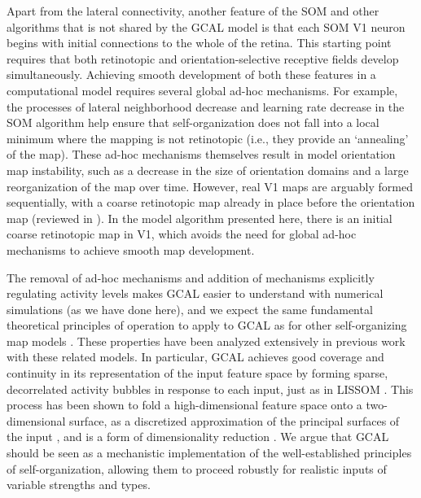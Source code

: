 \documentclass{article}
\begin{document}
Apart from the lateral connectivity, another feature of the SOM and
other algorithms that is not shared by the GCAL model is that each SOM
V1 neuron begins with initial connections to the whole of the
retina. This starting point requires that both retinotopic and
orientation-selective receptive fields develop simultaneously.
Achieving smooth development of both these features in a computational
model requires several global ad-hoc mechanisms. For example, the
processes of lateral neighborhood decrease and learning rate decrease in
the SOM algorithm help ensure that self-organization does not fall
into a local minimum where the mapping is not retinotopic (i.e., they
provide an `annealing' of the map).  These ad-hoc mechanisms
themselves result in model orientation map instability, such as a
decrease in the size of orientation domains and a large reorganization
of the map over time.  However, real V1 maps are arguably formed
sequentially, with a coarse retinotopic map already in place before
the orientation map (reviewed in \citealt{Huberman2008}). In the model
algorithm presented here, there is an initial coarse retinotopic map
in V1, which avoids the need for global ad-hoc mechanisms to achieve
smooth map development.

The removal of ad-hoc mechanisms and addition of mechanisms explicitly
regulating activity levels makes GCAL easier to understand with
numerical simulations (as we have done here), and we expect the same
fundamental theoretical principles of operation to apply
to GCAL as for other self-organizing map models
\citep{vondermalsburg:selforg,kohonen:original}.  These properties
have been analyzed extensively in previous work  with
these related models.  In particular, GCAL
achieves good coverage and continuity in its representation of the
input feature space \citep{swindale:natneuro00} by forming sparse,
decorrelated activity bubbles in response to each input, just as in
LISSOM \citep{Miikkulainen2005}.  This process has been shown to fold a
high-dimensional feature space onto a two-dimensional surface, as a
discretized approximation of the principal surfaces of the input
\citep{ritter:neural}, and is a form of dimensionality reduction
\citep{durbin:dimension}.  We argue that GCAL should be seen as a
mechanistic implementation of the well-established principles of
self-organization, allowing them to proceed robustly for realistic
inputs of variable strengths and types.
\end{document}
